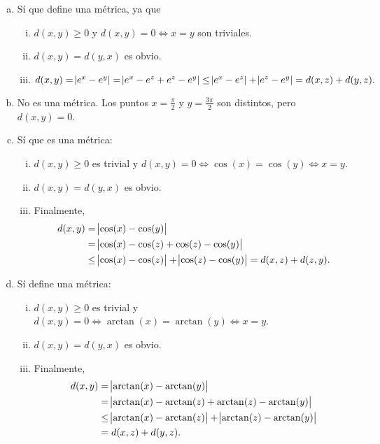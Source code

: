 \begin{ej}
	\begin{enumerate}[(a)]
		\item Sí que define una m\'etrica, ya que
			\begin{enumerate}[i)]
				\item $d(x,y) \geq 0$ y $d(x,y) = 0 \iff x = y$ son triviales.
				\item $d(x,y) = d(y,x)$ es obvio.
				\item $d(x,y) = \abs{e^x - e^y} = \abs{e^x - e^z + e^z - e^y} \leq \abs{e^x - e^z} + \abs{e^z - e^y} = d(x,z) + d(y,z).$
			\end{enumerate}
		\item No es una m\'etrica. Los puntos $x = \frac{\pi}{2}$ y $y = \frac{3\pi}{2}$ son distintos, pero $d(x, y) = 0$.
		\item Sí que es una m\'etrica:
			\begin{enumerate}[i)]
				\item $d(x, y) \geq 0$ es trivial y $d(x,y) = 0 \iff \cos(x) = \cos(y) \iff x = y$.
				\item $d(x, y) = d(y,x)$ es obvio.
				\item Finalmente,
					\begin{align*}
						d(x, y) &= \abs{\cos(x) - \cos(y)} \\
						&= \abs{\cos(x) - \cos(z) + \cos(z) - \cos(y)} \\
						&\leq \abs{\cos(x) - \cos(z)} + \abs{\cos(z) - \cos(y)} = d(x,z) + d(z,y).
					\end{align*}
			\end{enumerate}
		\item Sí define una m\'etrica:
			\begin{enumerate}[i)]
				\item $d(x, y) \geq 0$ es trivial y $d(x, y) = 0 \iff \arctan(x) = \arctan(y) \iff x = y$.
				\item $d(x, y) = d(y, x)$ es obvio.
				\item Finalmente,
					\begin{align*}
						d(x, y) &= \abs{\arctan(x) - \arctan(y)} \\
						&= \abs{\arctan(x) - \arctan(z) + \arctan(z) - \arctan(y)} \\
						&\leq \abs{\arctan(x) - \arctan(z)} + \abs{\arctan(z) - \arctan(y)} \\
						&= d(x, z) + d(y,z).
					\end{align*}
			\end{enumerate}
	\end{enumerate}


\end{ej}
